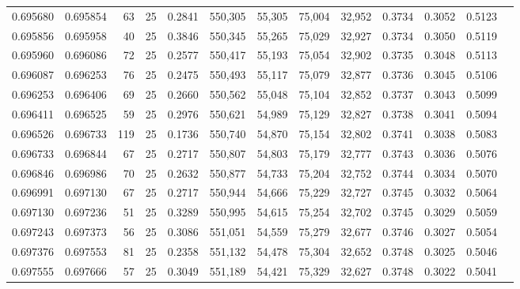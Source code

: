 \begin{tabular}{rrrrrrrrrrrrr}
0.695680 & 0.695854 &    63 &  25 &                                     0.2841 & 550,305 &  55,305 &  75,004 &  32,952 & 0.3734 & 0.3052 & 0.5123 \\
0.695856 & 0.695958 &    40 &  25 &                                     0.3846 & 550,345 &  55,265 &  75,029 &  32,927 & 0.3734 & 0.3050 & 0.5119 \\
0.695960 & 0.696086 &    72 &  25 &                                     0.2577 & 550,417 &  55,193 &  75,054 &  32,902 & 0.3735 & 0.3048 & 0.5113 \\
0.696087 & 0.696253 &    76 &  25 &                                     0.2475 & 550,493 &  55,117 &  75,079 &  32,877 & 0.3736 & 0.3045 & 0.5106 \\
0.696253 & 0.696406 &    69 &  25 &                                     0.2660 & 550,562 &  55,048 &  75,104 &  32,852 & 0.3737 & 0.3043 & 0.5099 \\
0.696411 & 0.696525 &    59 &  25 &                                     0.2976 & 550,621 &  54,989 &  75,129 &  32,827 & 0.3738 & 0.3041 & 0.5094 \\
0.696526 & 0.696733 &   119 &  25 &                                     0.1736 & 550,740 &  54,870 &  75,154 &  32,802 & 0.3741 & 0.3038 & 0.5083 \\
0.696733 & 0.696844 &    67 &  25 &                                     0.2717 & 550,807 &  54,803 &  75,179 &  32,777 & 0.3743 & 0.3036 & 0.5076 \\
0.696846 & 0.696986 &    70 &  25 &                                     0.2632 & 550,877 &  54,733 &  75,204 &  32,752 & 0.3744 & 0.3034 & 0.5070 \\
0.696991 & 0.697130 &    67 &  25 &                                     0.2717 & 550,944 &  54,666 &  75,229 &  32,727 & 0.3745 & 0.3032 & 0.5064 \\
0.697130 & 0.697236 &    51 &  25 &                                     0.3289 & 550,995 &  54,615 &  75,254 &  32,702 & 0.3745 & 0.3029 & 0.5059 \\
0.697243 & 0.697373 &    56 &  25 &                                     0.3086 & 551,051 &  54,559 &  75,279 &  32,677 & 0.3746 & 0.3027 & 0.5054 \\
0.697376 & 0.697553 &    81 &  25 &                                     0.2358 & 551,132 &  54,478 &  75,304 &  32,652 & 0.3748 & 0.3025 & 0.5046 \\
0.697555 & 0.697666 &    57 &  25 &                                     0.3049 & 551,189 &  54,421 &  75,329 &  32,627 & 0.3748 & 0.3022 & 0.5041 \\

\end{tabular}
